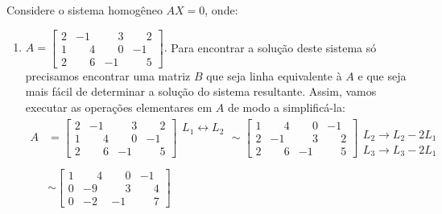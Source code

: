 \begin{exemplo}
	Considere o sistema homog\^eneo $AX = 0$, onde:
	\begin{enumerate}[label={\arabic*})]
		\item $A = \begin{bmatrix}
						2 & -1 & \phantom{-}3 & \phantom{-}2\\
						1 & \phantom{-}4 & \phantom{-}0 & -1\\
						2 & \phantom{-}6 & -1 & \phantom{-}5
					\end{bmatrix}.$
		Para encontrar a solu\c{c}\~ao deste sistema s\'o precisamos encontrar uma matriz $B$ que seja linha equivalente \`a $A$ e que seja mais f\'acil de determinar a solu\c{c}\~ao do sistema resultante. Assim, vamos executar as opera\c{c}\~oes elementares em $A$ de modo a simplific\'a-la:
		\begin{align*}
			A &=
				\left[
					\begin{array}{cccc}
						2 & -1 & \phantom{-}3 & \phantom{-}2\\
						1 & \phantom{-}4 & \phantom{-}0 & -1\\
						2 & \phantom{-}6 & -1 & \phantom{-}5
					\end{array}
				\right]
				\begin{array}{l}
					L_1 \leftrightarrow L_2\\
					\phantom{x}\\
					\phantom{x}
				\end{array} \sim
				\left[
					\begin{array}{cccc}
						1 & \phantom{-}4 & \phantom{-}0 & -1\\
						2 & -1 & \phantom{-}3 & \phantom{-}2\\
						2 & \phantom{-}6 & -1 & \phantom{-}5
					\end{array}
				\right]
				\begin{array}{l}
					\phantom{x}\\
					L_2 \to L_2 - 2L_1\\
					L_3 \to L_3 - 2L_1
				\end{array}\\ \\ &\sim
				\left[
					\begin{array}{cccc}
						1 & \phantom{-}4 & \phantom{-}0 & -1\\
						0 & -9 & \phantom{-}3 & \phantom{-}4\\
						0 & -2 & -1 & \phantom{-}7
					\end{array}
				\right]

\end{align*}
\end{enumerate}
\end{exemplo}
